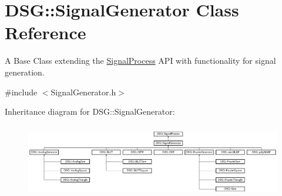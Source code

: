 \hypertarget{classDSG_1_1SignalGenerator}{\section{D\+S\+G\+:\+:Signal\+Generator Class Reference}
\label{classDSG_1_1SignalGenerator}
}


A Base Class extending the \hyperlink{classDSG_1_1SignalProcess}{Signal\+Process} A\+P\+I with functionality for signal generation.  




{\ttfamily \#include $<$Signal\+Generator.\+h$>$}

Inheritance diagram for D\+S\+G\+:\+:Signal\+Generator\+:\begin{figure}[H]
\begin{center}
\leavevmode
\includegraphics[height=3.245033cm]{classDSG_1_1SignalGenerator}
\end{center}
\end{figure}
